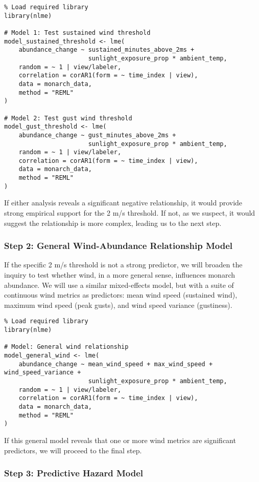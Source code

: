 \begin{verbatim}
% Load required library
library(nlme)

# Model 1: Test sustained wind threshold
model_sustained_threshold <- lme(
    abundance_change ~ sustained_minutes_above_2ms + 
                       sunlight_exposure_prop * ambient_temp,
    random = ~ 1 | view/labeler,
    correlation = corAR1(form = ~ time_index | view),
    data = monarch_data,
    method = "REML"
)

# Model 2: Test gust wind threshold
model_gust_threshold <- lme(
    abundance_change ~ gust_minutes_above_2ms + 
                       sunlight_exposure_prop * ambient_temp,
    random = ~ 1 | view/labeler,
    correlation = corAR1(form = ~ time_index | view),
    data = monarch_data,
    method = "REML"
)
\end{verbatim}

If either analysis reveals a significant negative relationship, it would provide strong empirical support for the 2 m/s threshold. If not, as we suspect, it would suggest the relationship is more complex, leading us to the next step.

\subsubsection{Step 2: General Wind-Abundance Relationship Model}

If the specific 2 m/s threshold is not a strong predictor, we will broaden the inquiry to test whether wind, in a more general sense, influences monarch abundance. We will use a similar mixed-effects model, but with a suite of continuous wind metrics as predictors: mean wind speed (sustained wind), maximum wind speed (peak gusts), and wind speed variance (gustiness).

\begin{verbatim}
% Load required library
library(nlme)

# Model: General wind relationship
model_general_wind <- lme(
    abundance_change ~ mean_wind_speed + max_wind_speed + wind_speed_variance +
                       sunlight_exposure_prop * ambient_temp,
    random = ~ 1 | view/labeler,
    correlation = corAR1(form = ~ time_index | view),
    data = monarch_data,
    method = "REML"
)
\end{verbatim}

If this general model reveals that one or more wind metrics are significant predictors, we will proceed to the final step.

\subsubsection{Step 3: Predictive Hazard Model}

